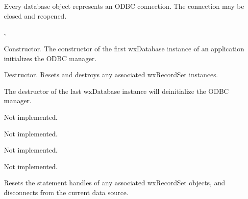 \section{}\label{wxdatabase}

Every database object represents an ODBC connection. The connection may be closed and reopened.




, 




Constructor. The constructor of the first wxDatabase instance of an
application initializes the ODBC manager.



Destructor. Resets and destroys any associated wxRecordSet instances.

The destructor of the last wxDatabase instance will deinitialize
the ODBC manager.



Not implemented.



Not implemented.



Not implemented.




Not implemented.



Resets the statement handles of any associated wxRecordSet objects,
and disconnects from the current data source.

